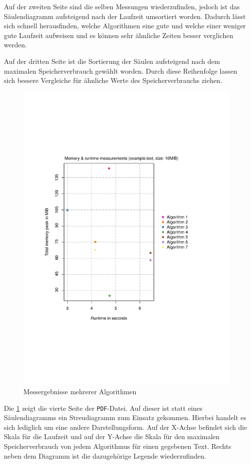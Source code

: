 Auf der zweiten Seite sind die selben Messungen wiederzufinden, jedoch ist das Säulendiagramm aufsteigend nach der Laufzeit umsortiert worden. Dadurch lässt sich schnell herausfinden, welche Algorithmen eine gute und welche einer weniger gute Laufzeit aufweisen und es können sehr ähnliche Zeiten besser verglichen werden.

Auf der dritten Seite ist die Sortierung der Säulen aufsteigend nach dem maximalen Spei\-cher\-ver\-brauch gewählt worden. Durch diese Reihenfolge lassen sich bessere Vergleiche für ähnliche Werte des Spei\-cher\-ver\-brauchs ziehen.

\begin{figure}
	\includegraphics[page = 1, width=.5\textwidth]{kapitel/3_framework/benchmark/sacabench-batch/beispiel_batch_streu.pdf}
	\caption{Messergebnisse mehrerer Algorithmen}
	\label{pdf:benchmark:batch:streu}
\end{figure}

Die \cref{pdf:benchmark:batch:streu} zeigt die vierte Seite der \texttt{PDF}-Datei. Auf dieser ist statt eines Säulendiagramms ein Streudiagramm zum Einsatz gekommen. Hierbei handelt  es sich lediglich um eine andere Darstellungsform. Auf der X-Achse befindet sich die Skala für die Laufzeit und auf der Y-Achse die Skala für den maximalen Spei\-cher\-ver\-brauch von jedem Algorithmus für einen gegebenen Text. Rechts neben dem Diagramm ist die dazugehörige Legende wiederzufinden.

